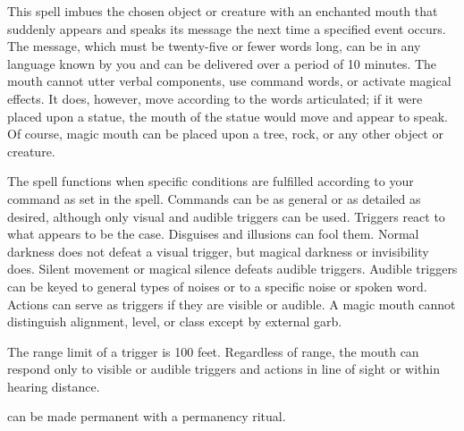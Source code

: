 \spellrng{\rngclose}
\begin{spelleffect}
This spell imbues the chosen object or creature with an enchanted mouth that suddenly appears and speaks its message the next time a specified event occurs. The message, which must be twenty-five or fewer words long, can be in any language known by you and can be delivered over a period of 10 minutes. The mouth cannot utter verbal components, use command words, or activate magical effects. It does, however, move according to the words articulated; if it were placed upon a statue, the mouth of the statue would move and appear to speak. Of course, magic mouth can be placed upon a tree, rock, or any other object or creature.
\par The spell functions when specific conditions are fulfilled according to your command as set in the spell. Commands can be as general or as detailed as desired, although only visual and audible triggers can be used. Triggers react to what appears to be the case. Disguises and illusions can fool them. Normal darkness does not defeat a visual trigger, but magical darkness or invisibility does. Silent movement or magical silence defeats audible triggers. Audible triggers can be keyed to general types of noises or to a specific noise or spoken word. Actions can serve as triggers if they are visible or audible. A magic mouth cannot distinguish alignment, level, or class except by external garb.
\par The range limit of a trigger is 100 feet. Regardless of range, the mouth can respond only to visible or audible triggers and actions in line of sight or within hearing distance.
\end{spelleffect}
\begin{spellnotes}
\par {} can be made permanent with a permanency ritual.
\end{spellnotes}

